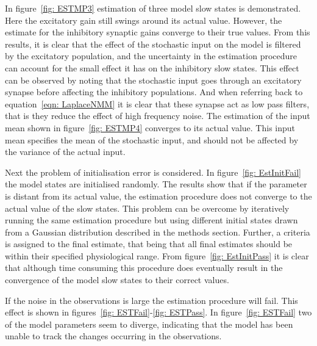 In figure~\ref{fig: ESTMP3}  estimation of three model slow states is demonstrated. Here the excitatory gain still swings around its actual value. However, the estimate for the inhibitory synaptic gains converge to their true values. From this results, it is clear that the effect of the stochastic input on the model is filtered by the excitatory population, and the uncertainty in the estimation procedure can account for the small effect it has on the inhibitory slow states. This effect can be observed by noting that the stochastic input goes through an excitatory synapse before affecting the inhibitory populations. And when referring back to equation~\ref{eqn: LaplaceNMM} it is clear that these synapse act as low pass filters, that is they reduce the effect of high frequency noise. The estimation of the input mean shown in figure~\ref{fig: ESTMP4} converges to its actual value. This input mean specifies the mean of the stochastic input, and should not be affected by the variance of the actual input.

Next the problem of initialisation error is considered. In figure~\ref{fig: EstInitFail} the model states are initialised randomly. The results show that if the parameter is distant from its actual value, the estimation procedure does not converge to the actual value of the slow states. This problem can be overcome by iteratively running the same estimation procedure but using different initial states drawn from a Gaussian distribution described in the methods section. Further, a criteria is assigned to the final estimate, that being that all final estimates should be within their specified physiological range. From figure~\ref{fig: EstInitPass} it is clear that although time consuming this procedure does eventually result in the convergence of the model slow states to their correct values. 


If the noise in the observations is large the estimation procedure will fail. This effect is shown in figures~\ref{fig: ESTFail}-\ref{fig: ESTPass}. In figure~\ref{fig: ESTFail} two of the model parameters seem to diverge, indicating that the model has been unable to track the changes occurring in the observations.

